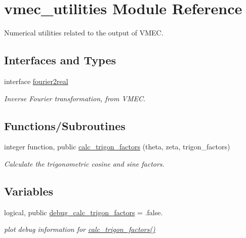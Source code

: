 \hypertarget{namespacevmec__utilities}{}\section{vmec\+\_\+utilities Module Reference}
\label{namespacevmec__utilities}


Numerical utilities related to the output of V\+M\+EC.  


\subsection*{Interfaces and Types}
\begin{DoxyCompactItemize}
\item 
interface \hyperlink{interfacevmec__utilities_1_1fourier2real}{fourier2real}
\begin{DoxyCompactList}\small\item\em Inverse Fourier transformation, from V\+M\+EC. \end{DoxyCompactList}\end{DoxyCompactItemize}
\subsection*{Functions/\+Subroutines}
\begin{DoxyCompactItemize}
\item 
integer function, public \hyperlink{namespacevmec__utilities_ac699116fc25fdea3e28e488513d97c87}{calc\+\_\+trigon\+\_\+factors} (theta, zeta, trigon\+\_\+factors)
\begin{DoxyCompactList}\small\item\em Calculate the trigonometric cosine and sine factors. \end{DoxyCompactList}\end{DoxyCompactItemize}
\subsection*{Variables}
\begin{DoxyCompactItemize}
\item 
logical, public \hyperlink{namespacevmec__utilities_abeb2bf5595170bdf2dd07a6f2bfa89ff}{debug\+\_\+calc\+\_\+trigon\+\_\+factors} = .false.
\begin{DoxyCompactList}\small\item\em plot debug information for \hyperlink{namespacevmec__utilities_ac699116fc25fdea3e28e488513d97c87}{calc\+\_\+trigon\+\_\+factors()} \end{DoxyCompactList}\end{DoxyCompactItemize}


